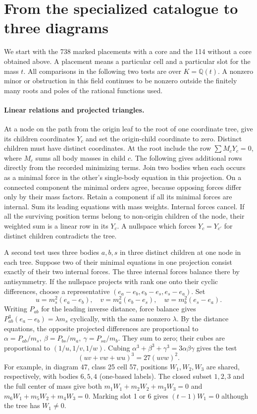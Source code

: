 \documentclass[11pt,letterpaper]{article}
\theoremstyle{definition}
\begin{document}
\section{From the specialized catalogue to three diagrams}
\label{br-ledger}
We start with the 738 marked placements with a core and the 114 without a
core obtained above.  A placement means a particular cell and a particular
slot for the mass $t$.  All comparisons in the following two tests are
over $K=\mathbb Q(t)$.  A nonzero minor or obstruction in this field
continues to be nonzero outside the finitely many roots and poles of the
rational functions used.

\paragraph{Linear relations and projected triangles.}
At a node on the path from the origin leaf to the root of one coordinate
tree, give its children coordinates $Y_c$ and set the origin-child
coordinate to zero. Distinct children must have distinct coordinates.
At the root include the row $\sum M_cY_c=0$, where $M_c$ sums all body
masses in child $c$.  The following gives additional rows directly from
the recorded minimizing terms.  Join two bodies when each occurs as a
minimal force in the other's single-body equation in this projection.
On a connected component the minimal orders agree, because opposing
forces differ only by their mass factors. Retain a component if all its
minimal forces are internal. Sum its leading equations with mass
weights. Internal forces cancel. If all the surviving position terms
belong to non-origin children of the node, their weighted sum is a
linear row in its $Y_c$. A nullspace which forces $Y_c=Y_{c'}$ for
distinct children contradicts the tree.

A second test uses three bodies $a,b,s$ in three distinct children at
one node in each tree. Suppose two of their minimal equations in one
projection consist exactly of their two internal forces. The three
internal forces balance there by antisymmetry. If the nullspace
projects with rank one onto their cyclic differences, choose a
representative $(e_a-e_b,e_b-e_s,e_s-e_a)$. Set
\[
 u=m_s^2(e_a-e_b),\quad v=m_a^2(e_b-e_s),\quad
 w=m_b^2(e_s-e_a).
\]
Writing $P_{ab}$ for the leading inverse distance, force balance gives
$P_{ab}^3(e_a-e_b)=\lambda m_s$ cyclically, with the same nonzero
$\lambda$. By the distance equations, the opposite projected
differences are proportional to
$\alpha=P_{ab}/m_s,\ \beta=P_{bs}/m_a,\ \gamma=P_{sa}/m_b$.
They sum to zero; their cubes are proportional to $(1/u,1/v,1/w)$.
Cubing $\alpha^3+\beta^3+\gamma^3=3\alpha\beta\gamma$ gives the test
\begin{equation}\label{br-node}
 (uv+vw+wu)^3=27(uvw)^2 .
\end{equation}
For example, in diagram 47, class 25 cell 57, positions $W_1,W_2,W_3$
are shared, respectively, with bodies $6,5,4$ (one-based labels).
The closed subset $1,2,3$ and the full center of mass give both
$m_1W_1+m_2W_2+m_3W_3=0$ and $m_6W_1+m_5W_2+m_4W_3=0$.
Marking slot 1 or 6 gives $(t-1)W_1=0$ although the tree has $W_1\ne0$.
\end{document}
